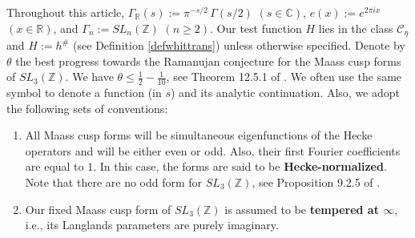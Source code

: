 \documentclass[11pt,reqno]{amsart}
\theoremstyle{definition}
\theoremstyle{definition}
\theoremstyle{remark}
\newcommand{\R}{\ensuremath{\mathbb{R}}}
\newcommand{\C}{\ensuremath{\mathbb{C}}}
\newcommand{\Z}{\ensuremath{\mathbb{Z}}}
\numberwithin{equation}{section}
\begin{document}
  	Throughout this article,  $\Gamma_{\R}(s):= \pi^{-s/2}\, \Gamma(s/2)$  $(s\in \C)$,  $e(x):=e^{2\pi i x}$  $(x\in \R)$, and $\Gamma_{n}:=SL_{n}(\Z)$  $(n\ge 2)$.   Our test function $H$ lies in the class $ \mathcal{C}_{\eta}$ and $H:= h^{\#}$ (see Definition \ref{defwhittrans}) unless otherwise specified.  Denote by $\theta $ the best progress towards the Ramanujan conjecture for the Maass cusp forms of $SL_{3}(\Z)$.  We have $\theta\le \frac{1}{2}- \frac{1}{10}$, see Theorem 12.5.1 of \cite{Go15}.    We often use the same symbol to denote a function (in $s$) and its analytic continuation.  Also, we adopt the following sets of conventions:
  \begin{enumerate}
  	\item \label{hecke} All Maass cusp forms will be  simultaneous eigenfunctions of the Hecke operators and will be either even or odd. Also, their first Fourier coefficients are  equal to $1$. In this case, the forms are said to be \textbf{Hecke-normalized}. Note that there are no odd form for  $SL_{3}(\Z)$, see Proposition 9.2.5 of \cite{Go15}. 
  	
  	
  	
  	
  	
  	\item Our fixed Maass cusp form  of $SL_{3}(\Z)$ is assumed to be \textbf{tempered at $\infty$}, i.e., its Langlands parameters are purely imaginary.    
  	
  
  	
  \end{enumerate}
  
 
\end{document}
